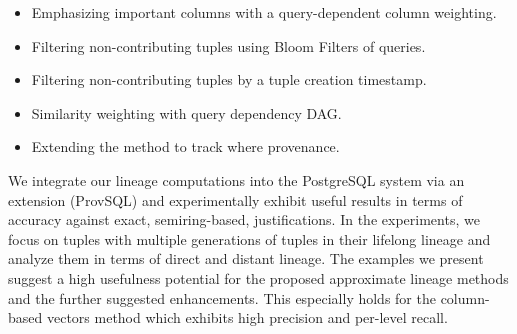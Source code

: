 {\begin{itemize}
    \item Emphasizing important columns with a query-dependent column weighting.
    \item Filtering non-contributing tuples using Bloom Filters of queries.
    \item Filtering non-contributing tuples by a tuple creation timestamp.
    \item Similarity weighting with query dependency DAG.
    \item Extending the method to track where provenance.
\end{itemize}
\par We integrate our lineage computations into the PostgreSQL system via an extension (ProvSQL) and experimentally exhibit useful results in terms of accuracy against exact, semiring-based, justifications.  In the experiments, we focus on tuples with multiple generations of tuples in their lifelong lineage and analyze them in terms of direct and distant lineage. The examples we present suggest a high usefulness potential for the proposed approximate lineage methods and the further suggested enhancements. This especially holds for the column-based vectors method which exhibits high precision and per-level recall. 


} %


